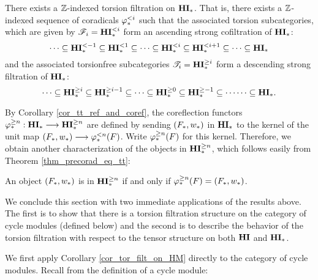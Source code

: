 \begin{cor}\label{cor_tor_filt_on_HM}
There exists a $\mathbb{Z}$-indexed torsion filtration on $\mathbf{HI}_*$. That 
is, there exists a $\mathbb{Z}$-indexed sequence of coradicals $\varphi^{< i}_{*}$
such that the associated torsion subcategories, which are given
by $\mathscr{F}_i = \mathbf{HI}_*^{< i}$
form an ascending strong cofiltration of $\mathbf{HI}_*$:
\[
\cdots \subseteq \mathbf{HI}_*^{< -1} \subseteq \mathbf{HI}_*^{< 1} \subseteq \cdots 
   \subseteq \mathbf{HI}_*^{< i} \subseteq \mathbf{HI}_*^{< i + 1} \subseteq \cdots 
   \subseteq \mathbf{HI}_*
\]
and the associated torsionfree subcategories $\mathscr{T}_i = \mathbf{HI}_*^{\geq i}$
form a descending strong filtration of $\mathbf{HI}_*$:
\[
\cdots \subseteq \mathbf{HI}_*^{\geq i} \subseteq \mathbf{HI}_*^{\geq i - 1} \subseteq 
   \cdots \subseteq \mathbf{HI}_*^{\geq 0} \subseteq \mathbf{HI}_*^{\geq -1} \subseteq \cdots
   \cdots \subseteq \mathbf{HI}_*.
\]
\end{cor}

By Corollary \ref{cor_tt_ref_and_coref}, the coreflection functors 
$\varphi^{\geq n}_{*} : \mathbf{HI}_* \longrightarrow \mathbf{HI}_*^{\geq n}$ are defined by sending $(F_*, 
w_*)$ in $\mathbf{HI}_*$ to the kernel of the unit map 
$(F_*, w_*) \longrightarrow \varphi^{< n}_{*}(F)$. Write $\varphi^{\geq n}_{*}(F)$ for this 
kernel. Therefore, we obtain another characterization of the objects 
in $\mathbf{HI}_*^{\geq n}$, which follows easily from Theorem
\ref{thm_precorad_eq_tt}:

\begin{cor}\label{cor_tgHM_prop}
An object $(F_*, w_*)$ is in $\mathbf{HI}_*^{\geq n}$ if and only
if $\varphi^{\geq n}_{*}(F) = (F_*, w_*)$.
\end{cor}

We conclude this section with two immediate applications of the
results above. The first is to show that there is a torsion 
filtration structure on the category of cycle modules (defined 
below) and the second is to describe the behavior of the torsion
filtration with respect to the tensor structure on both $\mathbf{HI}$
and $\mathbf{HI}_*$.

We first apply Corollary \ref{cor_tor_filt_on_HM} directly to the
category of cycle modules. Recall from \cite{Rost96} the 
definition of a cycle module:

